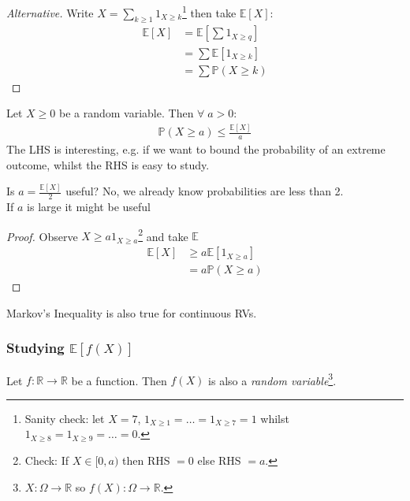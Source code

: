 \begin{proof}[Alternative]
    Write $X = \sum_{k \geq 1} 1_{X \geq k}$\footnote{Sanity check: let $X = 7$, $1_{X \geq 1} = \dots = 1_{X \geq 7} = 1$ whilst $1_{X \geq 8} = 1_{X \geq 9} = \dots = 0$.} then take $\mathbb{E}[X]$:
    \begin{align*}
        \mathbb{E}[X] &= \mathbb{E}\left[\sum 1_{X \geq q}\right] \\
        &= \sum \mathbb{E}[1_{X \geq k}] \\
        &= \sum \mathbb{P}(X \geq k)
    \end{align*} 
\end{proof} 

\begin{claim} \label{clm:markov}
    Let $X \geq 0$ be a random variable.
    Then $\forall \; a > 0$:
    \begin{align*}
        \mathbb{P}(X \geq a) \leq \frac{\mathbb{E}[X]}{a}
    \end{align*} 
    \color{red} The LHS is interesting, e.g. if we want to bound the probability of an extreme outcome, whilst the RHS is easy to study.
\end{claim}

\begin{note} \color{blue}
    Is $a = \frac{\mathbb{E}[X]}{2}$ useful? No, we already know probabilities are less than 2. \\
    If $a$ is large it might be useful
\end{note} 

\begin{proof}
    Observe $X \geq a 1_{X \geq a}$\footnote{Check: If $X \in [0, a)$ then RHS $= 0$ else RHS $= a$.} and take $\mathbb{E}$
    \begin{align*}
        \mathbb{E}[X] &\geq a \mathbb{E}[1_{X \geq a}] \\
        &= a \mathbb{P}(X \geq a)
    \end{align*} 
\end{proof} 

\begin{note} \color{red}
    Markov's Inequality is also true for continuous RVs.
\end{note} 

\subsubsection{Studying $\mathbb{E}[f(X)]$}
Let $f: \mathbb{R} \to \mathbb{R}$ be a function.
Then $f(X)$ is also a \emph{random variable}\footnote{\color{blue} $X: \Omega \to \mathbb{R}$ so $f(X) : \Omega \to \mathbb{R}$.}.


